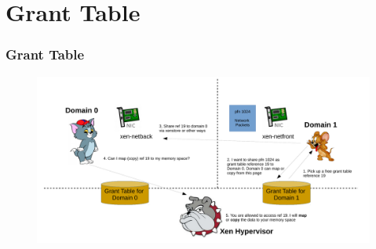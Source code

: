 \documentclass[aspectratio=169]{beamer}
\begin{document}

\section{Grant Table}
\begin{frame}
\frametitle{Grant Table}
\begin{figure}
\includegraphics[width=1.0\linewidth]{figures/grant.pdf}
\end{figure}
\end{frame}

\end{document}
